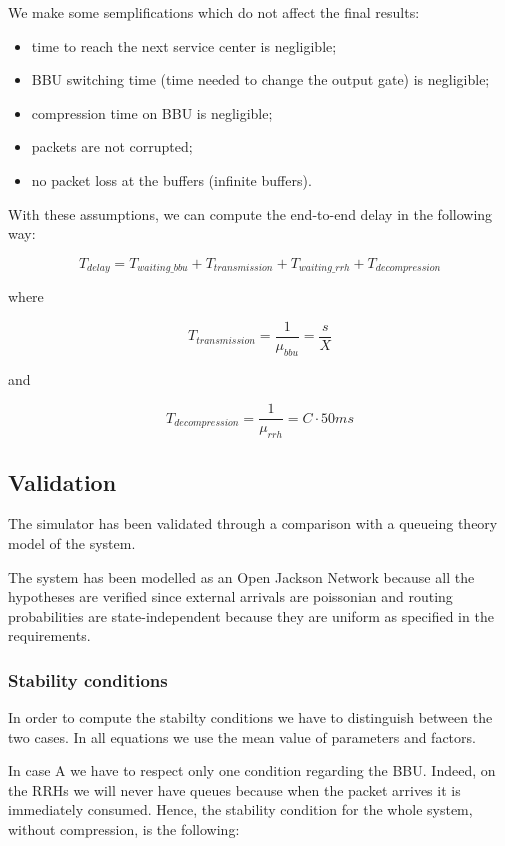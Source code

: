 \documentclass[11pt,a4paper,oneside, openright]{article}
\begin{document}
We make some semplifications which do not affect the final results:
\begin{itemize}
    \item time to reach the next service center is negligible;
    \item BBU switching time (time needed to change the output gate) is negligible;
    \item compression time on BBU is negligible;
    \item packets are not corrupted;
    \item no packet loss at the buffers (infinite buffers).
\end{itemize}

With these assumptions, we can compute the end-to-end delay in the following way:


$$ T_{delay} =  T_{waiting\_bbu} + T_{transmission} + T_{waiting\_rrh} + T_{decompression} $$

where 

$$ T_{transmission} = \frac{1}{\mu_{bbu}} = \frac{s}{X} $$

and

$$ T_{decompression} = \frac{1}{\mu_{rrh}} = C \cdot 50ms $$

\subsection{Validation}
The simulator has been validated through a comparison with a queueing theory model of the system.

The system has been modelled as an Open Jackson Network because all the hypotheses are verified since external arrivals are poissonian and routing probabilities are state-independent because they are uniform as specified in the requirements.

\subsubsection{Stability conditions}
In order to compute the stabilty conditions we have to distinguish between the two cases. In all equations we use the mean value of parameters and factors.

In case A we have to respect only one condition regarding the BBU. Indeed, on the RRHs we will never have queues because when the packet arrives it is immediately consumed.
Hence, the stability condition for the whole system, without compression, is the following:
\end{document}
